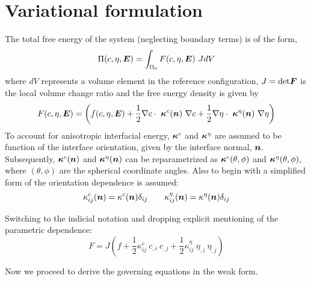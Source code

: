 \section{Variational formulation}
The total free energy of the system (neglecting boundary terms) is of the form,
\begin{equation}
\Pi(c, \eta, \mbox{\boldmath$ E$}) = \int_{\Omega_0} F(c, \eta, \mbox{\boldmath$ E$}) ~J dV 
\end{equation}
where $dV$ represents a volume element in the reference configuration, $J= \text{det} \mbox{\boldmath$ F$}$ is the local volume change ratio and the free energy density is given by
\begin{equation}
 F(c, \eta, \mbox{\boldmath$ E$}) = \left(  f(c, \eta, \mbox{\boldmath$ E$}) + \frac{1}{2} \nabla  c  \cdot ~\mbox{\boldmath$\kappa$}^c(\mbox{\boldmath$ n$}) ~\nabla  c + \frac{1}{2} \nabla  \eta  \cdot ~\mbox{\boldmath$\kappa$}^{\eta}(\mbox{\boldmath$ n$}) ~\nabla  \eta \right)
\end{equation}
To account for anisotropic interfacial energy, $\mbox{\boldmath$\kappa$}^c$ and $\mbox{\boldmath$\kappa$}^{\eta}$ are assumed to be function of the interface orientation, given by the interface normal, $\mbox{\boldmath$ n$}$. Subsequently, $\mbox{\boldmath$\kappa$}^c(\mbox{\boldmath$ n$})$ and $\mbox{\boldmath$\kappa$}^{\eta}(\mbox{\boldmath$ n$})$ can be reparametrized as $\mbox{\boldmath$\kappa$}^c(\theta, \phi)$ and $\mbox{\boldmath$\kappa$}^{\eta}(\theta, \phi)$, where $(\theta, \phi)$ are the spherical coordinate angles. Also to begin with a simplified form of the orientation dependence is assumed:
\begin{equation}
 \kappa^c_{ij} (\mbox{\boldmath$ n$}) = \kappa^c(\mbox{\boldmath$ n$}) \delta_{ij} \qquad  \kappa^{\eta}_{ij} (\mbox{\boldmath$ n$}) = \kappa^{\eta}(\mbox{\boldmath$ n$}) \delta_{ij}
\end{equation}

\noindent Switching to the indicial notation and dropping explicit mentioning of the parametric dependence:
\begin{equation}
 F =  J \left( f + \frac{1}{2} \kappa^c_{ij}~c_{,i}~c_{,j} + \frac{1}{2} \kappa^{\eta}_{ij} ~\eta_{,i} ~\eta_{,j} \right) 
\end{equation}

\noindent Now we proceed to derive the governing equations in the weak form.

